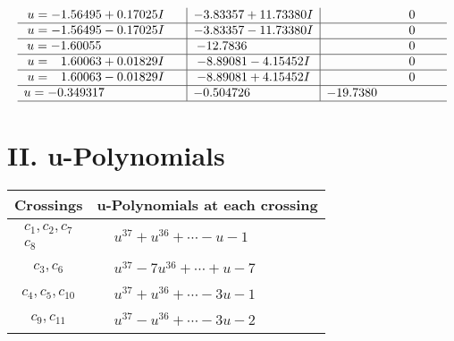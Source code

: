 \documentclass[1p]{elsarticle_modified}
\theoremstyle{definition}
\begin{document}
$$\begin{array}{c|c|c}
\begin{aligned}
u &= -1.56495 + 0.17025 I\end{aligned}
 & -3.83357 + 11.73380 I & \phantom{-0.000000 } 0 \\ \hline\begin{aligned}
u &= -1.56495 - 0.17025 I\end{aligned}
 & -3.83357 - 11.73380 I & \phantom{-0.000000 } 0 \\ \hline\begin{aligned}
u &= -1.60055\phantom{ +0.000000I}\end{aligned}
 & -12.7836\phantom{ +0.000000I} & \phantom{-0.000000 } 0 \\ \hline\begin{aligned}
u &= \phantom{-}1.60063 + 0.01829 I\end{aligned}
 & -8.89081 - 4.15452 I & \phantom{-0.000000 } 0 \\ \hline\begin{aligned}
u &= \phantom{-}1.60063 - 0.01829 I\end{aligned}
 & -8.89081 + 4.15452 I & \phantom{-0.000000 } 0 \\ \hline\begin{aligned}
u &= -0.349317\phantom{ +0.000000I}\end{aligned}
 & -0.504726\phantom{ +0.000000I} & -19.7380\phantom{ +0.000000I}\\
 \hline 
 \end{array}$$\newpage
\newpage\renewcommand{\arraystretch}{1}
\centering \section*{ II. u-Polynomials}
\begin{tabular}{m{50pt}|m{274pt}}
Crossings & \hspace{64pt}u-Polynomials at each crossing \\
\hline $$\begin{aligned}c_{1},c_{2},c_{7}\\c_{8}\end{aligned}$$&$\begin{aligned}
&u^{37}+u^{36}+\cdots- u-1
\end{aligned}$\\
\hline $$\begin{aligned}c_{3},c_{6}\end{aligned}$$&$\begin{aligned}
&u^{37}-7 u^{36}+\cdots+u-7
\end{aligned}$\\
\hline $$\begin{aligned}c_{4},c_{5},c_{10}\end{aligned}$$&$\begin{aligned}
&u^{37}+u^{36}+\cdots-3 u-1
\end{aligned}$\\
\hline $$\begin{aligned}c_{9},c_{11}\end{aligned}$$&$\begin{aligned}
&u^{37}- u^{36}+\cdots-3 u-2
\end{aligned}$\\
\hline
\end{tabular}\newpage\renewcommand{\arraystretch}{1}
\end{document}
